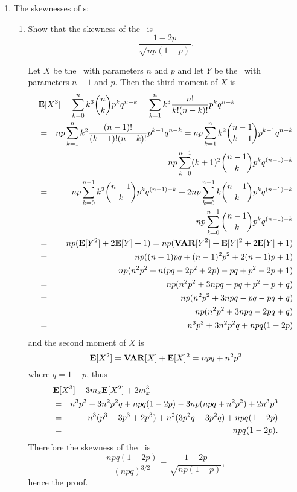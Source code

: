 \begin{enumerate}
\begin{enumerate}
		\item The skewnesses of \randvar s:
		\begin{enumerate}
			\item Show that the skewness of the \binomrv\ is
			\begin{equation}
			\label{eq-skew-binom}
				\frac{1-2p}{\sqrt{np(1-p)}}.
			\end{equation}
			\ifdefined\sol
			\begin{solution}
				Let $X$ be the \binomrv\ with parameters $n$ and $p$
				and let $Y$ be the \binomrv\ with parameters $n-1$ and $p$.
				Then the third moment of $X$ is
				\begin{eqnarray*}
					\lefteqn{
					\Exp{X^3}
					= \sumkzton k^3 \chs{n}{k}  p^k q^{n-k}
					= \sumkton k^3 \frac{n!}{k!(n-k)!} p^k q^{n-k}
					}
					\\
					&=& np \sumkton k^2 \frac{(n-1)!}{(k-1)!(n-k)!} p^{k-1} q^{n-k}
					= np \sumkton k^2 \chs{n-1}{k-1} p^{k-1} q^{n-k}
					\\
					&=& np \sumto{k}{0}{n-1} (k+1)^2 \chs{n-1}{k} p^{k} q^{(n-1)-k}
					\\
					&=& np \sumto{k}{0}{n-1} k^2 \chs{n-1}{k} p^{k} q^{(n-1)-k}
					+ 2np \sumto{k}{0}{n-1} k \chs{n-1}{k} p^{k} q^{(n-1)-k}
					\\
					&&
					+ np \sumto{k}{0}{n-1} \chs{n-1}{k} p^{k} q^{(n-1)-k}
					\\
					&=&
					np(\Exp{Y^2} + 2\Exp{Y} + 1 )
					= np(\VAR{Y^2} + \Exp{Y}^2 + 2\Exp{Y} + 1 )
					\\ &=&
					np( (n-1)pq + (n-1)^2p^2 + 2 (n-1)p + 1)
					\\ &=&
					np( n^2p^2 + n ( pq -2p^2 + 2p ) -pq + p^2 - 2p  + 1 )
					\\ &=&
					np( n^2p^2 + 3 n pq -pq + p^2 - p  + q )
					\\ &=&
					np( n^2p^2 + 3 n pq -pq - pq  + q )
					\\ &=&
					np( n^2p^2 + 3 n pq -2pq + q )
					\\ &=&
					n^3p^3 + 3 n^2 p^2q + npq(1-2p)
				\end{eqnarray*}
				and the second moment of $X$ is
				\[
					{\bf E}[X^2] = {\bf VAR}[X] + {\bf E}[X]^2
					= npq + n^2p^2
				\]
				where $q=1-p$,
				thus
				\begin{eqnarray*}
					\lefteqn{
					\Exp{X^3} - 3\mux \Exp{X^2} + 2 \mux^3
					}
					\\ &=&
					n^3p^3 + 3 n^2 p^2q + npq(1-2p)
					-3np(npq+n^2p^2) + 2n^3p^3
					\\ &=&
					n^3( p^3 -3 p^3 + 2p^3)
					+ n^2( 3p^2q - 3p^2q)
					+ npq(1-2p)
					\\ &=&
					npq(1-2p).
				\end{eqnarray*}
				Therefore the skewness of the \binomrv\ is
				\[
					\frac{npq(1-2p)}{(npq)^{3/2}}
					= \frac{1-2p}{\sqrt{np(1-p)}},
				\]
				hence the proof.
			\end{solution}
			\fi


\end{enumerate}
\end{enumerate}
\end{enumerate}
